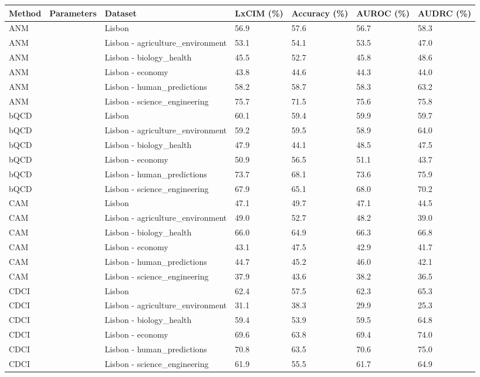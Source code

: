 \begin{tabular}{lllllll}
\toprule
Method & Parameters & Dataset & LxCIM (\%) & Accuracy (\%) & AUROC (\%) & AUDRC (\%) \\
\midrule
ANM &  & Lisbon & 56.9 & 57.6 & 56.7 & 58.3 \\
ANM &  & Lisbon - agriculture\_environment & 53.1 & 54.1 & 53.5 & 47.0 \\
ANM &  & Lisbon - biology\_health & 45.5 & 52.7 & 45.8 & 48.6 \\
ANM &  & Lisbon - economy & 43.8 & 44.6 & 44.3 & 44.0 \\
ANM &  & Lisbon - human\_predictions & 58.2 & 58.7 & 58.3 & 63.2 \\
ANM &  & Lisbon - science\_engineering & 75.7 & 71.5 & 75.6 & 75.8 \\
bQCD &  & Lisbon & 60.1 & 59.4 & 59.9 & 59.7 \\
bQCD &  & Lisbon - agriculture\_environment & 59.2 & 59.5 & 58.9 & 64.0 \\
bQCD &  & Lisbon - biology\_health & 47.9 & 44.1 & 48.5 & 47.5 \\
bQCD &  & Lisbon - economy & 50.9 & 56.5 & 51.1 & 43.7 \\
bQCD &  & Lisbon - human\_predictions & 73.7 & 68.1 & 73.6 & 75.9 \\
bQCD &  & Lisbon - science\_engineering & 67.9 & 65.1 & 68.0 & 70.2 \\
CAM &  & Lisbon & 47.1 & 49.7 & 47.1 & 44.5 \\
CAM &  & Lisbon - agriculture\_environment & 49.0 & 52.7 & 48.2 & 39.0 \\
CAM &  & Lisbon - biology\_health & 66.0 & 64.9 & 66.3 & 66.8 \\
CAM &  & Lisbon - economy & 43.1 & 47.5 & 42.9 & 41.7 \\
CAM &  & Lisbon - human\_predictions & 44.7 & 45.2 & 46.0 & 42.1 \\
CAM &  & Lisbon - science\_engineering & 37.9 & 43.6 & 38.2 & 36.5 \\
CDCI &  & Lisbon & 62.4 & 57.5 & 62.3 & 65.3 \\
CDCI &  & Lisbon - agriculture\_environment & 31.1 & 38.3 & 29.9 & 25.3 \\
CDCI &  & Lisbon - biology\_health & 59.4 & 53.9 & 59.5 & 64.8 \\
CDCI &  & Lisbon - economy & 69.6 & 63.8 & 69.4 & 74.0 \\
CDCI &  & Lisbon - human\_predictions & 70.8 & 63.5 & 70.6 & 75.0 \\
CDCI &  & Lisbon - science\_engineering & 61.9 & 55.5 & 61.7 & 64.9 \\

\end{tabular}
